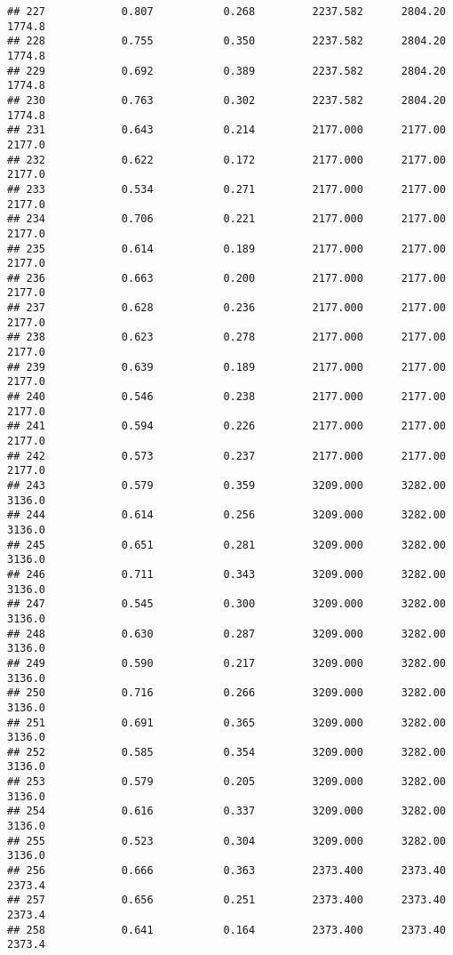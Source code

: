 \documentclass[
]{article}
\begin{document}
\begin{verbatim}
## 227            0.807           0.268         2237.582      2804.20       1774.8
## 228            0.755           0.350         2237.582      2804.20       1774.8
## 229            0.692           0.389         2237.582      2804.20       1774.8
## 230            0.763           0.302         2237.582      2804.20       1774.8
## 231            0.643           0.214         2177.000      2177.00       2177.0
## 232            0.622           0.172         2177.000      2177.00       2177.0
## 233            0.534           0.271         2177.000      2177.00       2177.0
## 234            0.706           0.221         2177.000      2177.00       2177.0
## 235            0.614           0.189         2177.000      2177.00       2177.0
## 236            0.663           0.200         2177.000      2177.00       2177.0
## 237            0.628           0.236         2177.000      2177.00       2177.0
## 238            0.623           0.278         2177.000      2177.00       2177.0
## 239            0.639           0.189         2177.000      2177.00       2177.0
## 240            0.546           0.238         2177.000      2177.00       2177.0
## 241            0.594           0.226         2177.000      2177.00       2177.0
## 242            0.573           0.237         2177.000      2177.00       2177.0
## 243            0.579           0.359         3209.000      3282.00       3136.0
## 244            0.614           0.256         3209.000      3282.00       3136.0
## 245            0.651           0.281         3209.000      3282.00       3136.0
## 246            0.711           0.343         3209.000      3282.00       3136.0
## 247            0.545           0.300         3209.000      3282.00       3136.0
## 248            0.630           0.287         3209.000      3282.00       3136.0
## 249            0.590           0.217         3209.000      3282.00       3136.0
## 250            0.716           0.266         3209.000      3282.00       3136.0
## 251            0.691           0.365         3209.000      3282.00       3136.0
## 252            0.585           0.354         3209.000      3282.00       3136.0
## 253            0.579           0.205         3209.000      3282.00       3136.0
## 254            0.616           0.337         3209.000      3282.00       3136.0
## 255            0.523           0.304         3209.000      3282.00       3136.0
## 256            0.666           0.363         2373.400      2373.40       2373.4
## 257            0.656           0.251         2373.400      2373.40       2373.4
## 258            0.641           0.164         2373.400      2373.40       2373.4

\end{verbatim}
\end{document}
